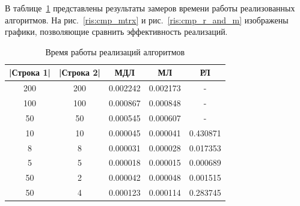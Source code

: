 \documentclass[a4paper,12pt]{article}
\begin{document}
	    В таблице~\ref{tabular:test_time} представлены результаты замеров времени работы реализованных алгоритмов. На рис.~\ref{ris:cmp_mtrx} и рис.~\ref{ris:cmp_r_and_m} изображены графики, позволяющие сравнить эффективность реализаций.
	\begin{table}[H]
	\caption{\label{tabular:test_time} Время работы реализаций алгоритмов}
	\begin{center}	    
	\begin{tabular}{|c|c|c|c|c|}
        				
        				\hline
        				|Строка 1| & |Строка 2| &МДЛ      &МЛ        &РЛ\\ 
        				\hline
        				200      &200       &0.002242 &0.002173  &-\\
        				100      &100       &0.000867 &0.000848  &-\\
        				50       &50        &0.000545 &0.000607  &-\\
        				10       &10        &0.000045 &0.000041  &0.430871\\ 
        				8        &8         &0.000031 &0.000028  &0.017353\\
        				5        &5         &0.000018 &0.000015  &0.000689\\ 
        				50       &2         &0.000042 &0.000048  &0.001515\\
        				50       &4         &0.000123 &0.000114  &0.283745\\
        				\hline
	\end{tabular}
	\end{center}
	\end{table}	
	
\end{document}
